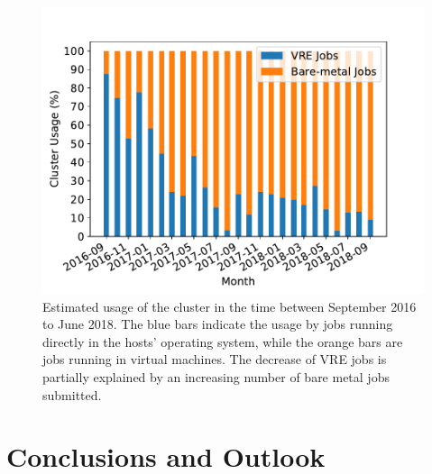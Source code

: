 

\begin{figure}
\begin{center}
  \includegraphics[width=\linewidth]{figures/NodeUsage_2016-09_2018-09.pdf}
  \caption{Estimated usage of the \NEMO cluster in the time between September 2016
    to June 2018. The blue bars indicate the usage by jobs
    running directly in the hosts' operating system, while the orange bars are jobs
    running in virtual machines. The decrease of VRE jobs is partially explained
    by an increasing number of bare metal jobs submitted.}
  \label{fig-nodeusage}
\end{center}
\end{figure}

\section{Conclusions and Outlook}


